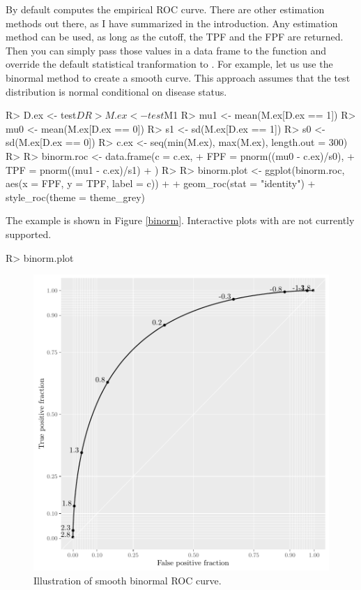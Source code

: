 \documentclass[codesnippet]{jss}
\begin{document}
By default  computes the empirical ROC curve. There
are other estimation methods out there, as I have summarized in the
introduction. Any estimation method can be used, as long as the cutoff,
the TPF and the FPF are returned. Then you can simply pass those values
in a data frame to the  function and override the default
statistical tranformation to . For example, let us
use the binormal method to create a smooth curve. This approach assumes
that the test distribution is normal conditional on disease status.

\begin{Schunk}
\begin{Sinput}
R> D.ex <- test$D
R> M.ex <- test$M1
R> mu1 <- mean(M.ex[D.ex == 1])
R> mu0 <- mean(M.ex[D.ex == 0])
R> s1 <- sd(M.ex[D.ex == 1])
R> s0 <- sd(M.ex[D.ex == 0])
R> c.ex <- seq(min(M.ex), max(M.ex), length.out = 300)
R> 
R> binorm.roc <- data.frame(c = c.ex, 
+                              FPF = pnorm((mu0 - c.ex)/s0), 
+                              TPF = pnorm((mu1 - c.ex)/s1)
+                              )
R> 
R> binorm.plot <- ggplot(binorm.roc, aes(x = FPF, y = TPF, label = c)) + 
+   geom_roc(stat = "identity") + style_roc(theme = theme_grey)
\end{Sinput}
\end{Schunk}

The example is shown in Figure \ref{binorm}. Interactive plots with
 are not currently supported.

\begin{Schunk}
\begin{Sinput}
R> binorm.plot
\end{Sinput}
\begin{figure}
\includegraphics{figure/binormal-1} \caption[Illustration of smooth binormal ROC curve]{Illustration of smooth binormal ROC curve. \label{binorm}}\label{fig:binormal}
\end{figure}
\end{Schunk}
\end{document}
